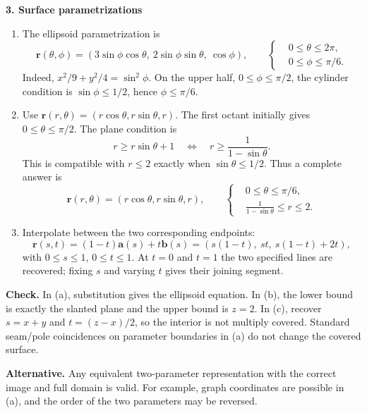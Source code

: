 \documentclass[11pt,letterpaper]{article}
\renewcommand{\vec}[1]{\mathbf{#1}}
\newcommand{\solutionproblem}[3]{%
  \par\bigskip\Needspace{7\baselineskip}
  \noindent\textbf{#1. #2}\par\nobreak
}
\newcommand{\verification}[1]{\par\textbf{Check.} #1\par}
\newcommand{\alternative}[1]{\par\textbf{Alternative.} #1\par}
\begin{document}
\solutionproblem{3}{Surface parametrizations}{12}
\begin{enumerate}[label=(\alph*)]
\item The ellipsoid parametrization is
\[
\boxed{\vec r(\theta,\phi)=
(3\sin\phi\cos\theta,\ 2\sin\phi\sin\theta,\ \cos\phi)},\qquad
\left\{\begin{aligned}
&0\leq\theta\leq2\pi,\\
&0\leq\phi\leq\pi/6.
\end{aligned}\right.
\]
Indeed, $x^2/9+y^2/4=\sin^2\phi$. On the upper half,
$0\leq\phi\leq\pi/2$, the cylinder condition is
$\sin\phi\leq1/2$, hence $\phi\leq\pi/6$.

\item Use $\vec r(r,\theta)=(r\cos\theta,r\sin\theta,r)$. The first
octant initially gives $0\leq\theta\leq\pi/2$. The plane condition is
\[
r\geq r\sin\theta+1
\quad\Longleftrightarrow\quad
r\geq\frac1{1-\sin\theta}.
\]
This is compatible with $r\leq2$ exactly when
$\sin\theta\leq1/2$. Thus a complete answer is
\[
\boxed{\vec r(r,\theta)=(r\cos\theta,r\sin\theta,r)},\qquad
\left\{\begin{aligned}
&0\leq\theta\leq\pi/6,\\
&\frac1{1-\sin\theta}\leq r\leq2.
\end{aligned}\right.
\]

\item Interpolate between the two corresponding endpoints:
\[
\boxed{\vec r(s,t)=(1-t)\vec a(s)+t\vec b(s)
=(s(1-t),\ st,\ s(1-t)+2t)},
\]
with $0\leq s\leq1$, $0\leq t\leq1$.
At $t=0$ and $t=1$ the two specified lines are recovered; fixing $s$
and varying $t$ gives their joining segment.
\end{enumerate}
\verification{In (a), substitution gives the ellipsoid equation. In
(b), the lower bound is exactly the slanted plane and the upper bound
is $z=2$. In (c), recover $s=x+y$ and $t=(z-x)/2$, so the interior
is not multiply covered. Standard seam/pole coincidences on parameter
boundaries in (a) do not change the covered surface.}
\alternative{Any equivalent two-parameter representation with the
correct image and full domain is valid. For example, graph coordinates
are possible in (a), and the order of the two parameters may be reversed.}
\end{document}
